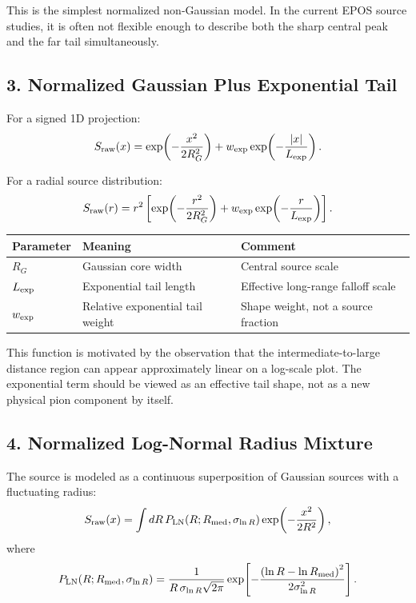 \documentclass[11pt]{article}
\begin{document}
This is the simplest normalized non-Gaussian model. In the current EPOS source
studies, it is often not flexible enough to describe both the sharp central
peak and the far tail simultaneously.

\subsection*{3. Normalized Gaussian Plus Exponential Tail}

For a signed 1D projection:
\begin{equation}
  S_{\rm raw}(x)
  =
  \exp\!\left(-\frac{x^2}{2R_G^2}\right)
  +
  w_{\rm exp}
  \exp\!\left(-\frac{|x|}{L_{\rm exp}}\right).
\end{equation}

For a radial source distribution:
\begin{equation}
  S_{\rm raw}(r)
  =
  r^2
  \left[
  \exp\!\left(-\frac{r^2}{2R_G^2}\right)
  +
  w_{\rm exp}
  \exp\!\left(-\frac{r}{L_{\rm exp}}\right)
  \right].
\end{equation}

\begin{center}
\begin{tabular}{lll}
\toprule
Parameter & Meaning & Comment \\
\midrule
\(R_G\) & Gaussian core width & Central source scale \\
\(L_{\rm exp}\) & Exponential tail length & Effective long-range falloff scale \\
\(w_{\rm exp}\) & Relative exponential tail weight & Shape weight, not a source fraction \\
\bottomrule
\end{tabular}
\end{center}

This function is motivated by the observation that the intermediate-to-large
distance region can appear approximately linear on a log-scale plot. The
exponential term should be viewed as an effective tail shape, not as a new
physical pion component by itself.

\subsection*{4. Normalized Log-Normal Radius Mixture}

The source is modeled as a continuous superposition of Gaussian sources with a
fluctuating radius:
\begin{equation}
  S_{\rm raw}(x)
  =
  \int dR\,
  P_{\rm LN}(R;R_{\rm med},\sigma_{\ln R})
  \exp\!\left(-\frac{x^2}{2R^2}\right),
\end{equation}
where
\begin{equation}
  P_{\rm LN}(R;R_{\rm med},\sigma_{\ln R})
  =
  \frac{1}{R\,\sigma_{\ln R}\sqrt{2\pi}}
  \exp\!\left[
    -\frac{\left(\ln R-\ln R_{\rm med}\right)^2}
          {2\sigma_{\ln R}^2}
  \right].
\end{equation}
\end{document}
